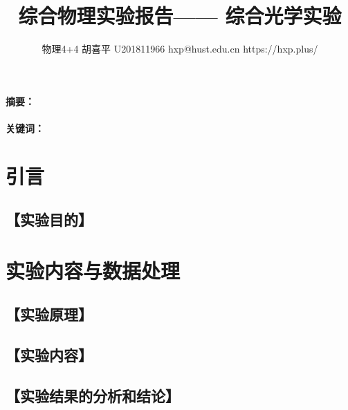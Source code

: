 \documentclass{ctexart}
\date{}
\newcommand{\generatetitle}[6]{\title{\zihao{3}\heiti#1} \author{#2 \quad
\quad #3 \quad\quad #4 \quad\quad #5 \quad\quad #6} \maketitle\thispagestyle{fancy}}
\let\oldsubsection\subsection
\renewcommand{\subsection}[1]{\oldsubsection{\!\!\!\!\!\!【#1】}}
\let\oldparagraph\paragraph
\renewcommand{\paragraph}[1]{\oldparagraph{#1：\!\!\!\!\!\!}}
\begin{document}
    \generatetitle{综合物理实验报告——
    综合光学实验}{物理4+4}{胡喜平}{U201811966}{hxp@hust.edu.cn}{https://hxp.plus/}

    \paragraph{摘要}

    \paragraph{关键词}


    \section{引言}

    \subsection{实验目的}


    \section{实验内容与数据处理}

    \subsection{实验原理}

    \subsection{实验内容}

    \subsection{实验结果的分析和结论}
\end{document}

